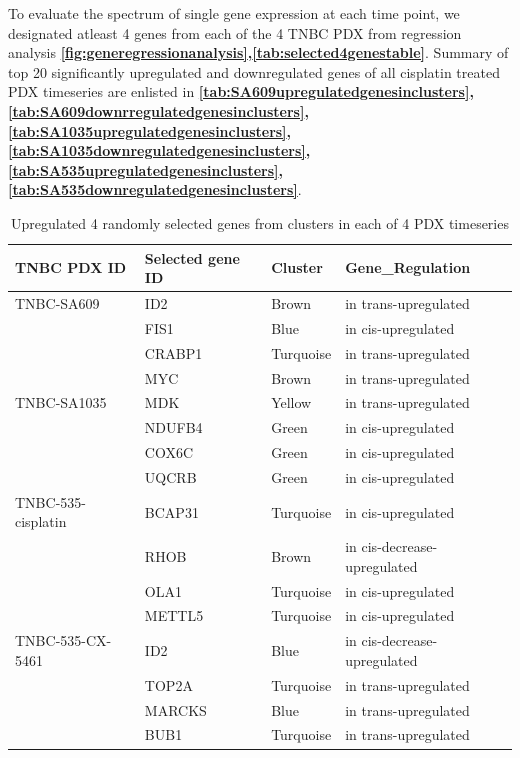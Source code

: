 To evaluate the spectrum of single gene expression at each time point, we designated atleast 4 genes from each of the 4 TNBC PDX from regression analysis \textbf{\autoref{fig:generegressionanalysis},\autoref{tab:selected4genestable}}. Summary of top 20 significantly upregulated and downregulated genes of all cisplatin treated PDX timeseries are enlisted in \textbf{\autoref{tab:SA609upregulatedgenesinclusters}, \autoref{tab:SA609downrregulatedgenesinclusters}, \autoref{tab:SA1035upregulatedgenesinclusters}, \autoref{tab:SA1035downregulatedgenesinclusters}, \autoref{tab:SA535upregulatedgenesinclusters}, \autoref{tab:SA535downregulatedgenesinclusters}}.


 \begin{table}[htbp]
   \centering
   \caption{Upregulated 4 randomly selected genes from clusters in each of 4 PDX timeseries}
     \begin{tabular}{|r|l|l|l|}
     \hline
     \multicolumn{1}{|l|}{TNBC PDX ID} & Selected gene ID & Cluster & Gene\_Regulation \\
     \hline
     \multicolumn{1}{|l|}{TNBC-SA609} & ID2 & Brown & in trans-upregulated \\
       & FIS1 & Blue & in cis-upregulated \\
       & CRABP1 & Turquoise & in trans-upregulated \\
       & MYC & Brown & in trans-upregulated \\
     \multicolumn{1}{|l|}{TNBC-SA1035} & MDK & Yellow & in trans-upregulated \\
       & NDUFB4 & Green & in cis-upregulated \\
       & COX6C & Green & in cis-upregulated \\
       & UQCRB & Green & in cis-upregulated \\
     \multicolumn{1}{|l|}{TNBC-535-cisplatin} & BCAP31 & Turquoise & in cis-upregulated \\
       & RHOB & Brown & in cis-decrease-upregulated \\
       & OLA1 & Turquoise & in cis-upregulated \\
       & METTL5 & Turquoise & in cis-upregulated \\
     \multicolumn{1}{|l|}{TNBC-535-CX-5461} & ID2 & Blue & in cis-decrease-upregulated \\
       & TOP2A & Turquoise & in trans-upregulated \\
       & MARCKS & Blue & in trans-upregulated \\
       & BUB1 & Turquoise & in trans-upregulated \\
       \hline
     \end{tabular}%
   \label{tab:selected4genestable}%
 \end{table}%
